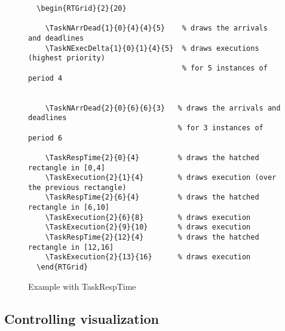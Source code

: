 \documentclass{article}
\begin{document}
\begin{figure}
  \centering
  \begin{RTGrid}{2}{20}
  

 

  \end{RTGrid}  
\begin{verbatim}
  \begin{RTGrid}{2}{20}
  
    \TaskNArrDead{1}{0}{4}{4}{5}    % draws the arrivals and deadlines
    \TaskNExecDelta{1}{0}{1}{4}{5}  % draws executions (highest priority) 
                                    % for 5 instances of period 4 

 
    \TaskNArrDead{2}{0}{6}{6}{3}   % draws the arrivals and deadlines
                                   % for 3 instances of period 6 

    \TaskRespTime{2}{0}{4}         % draws the hatched rectangle in [0,4]
    \TaskExecution{2}{1}{4}        % draws execution (over the previous rectangle)
    \TaskRespTime{2}{6}{4}         % draws the hatched rectangle in [6,10]
    \TaskExecution{2}{6}{8}        % draws execution
    \TaskExecution{2}{9}{10}       % draws execution
    \TaskRespTime{2}{12}{4}        % draws the hatched rectangle in [12,16]
    \TaskExecution{2}{13}{16}      % draws execution   
  \end{RTGrid}   
\end{verbatim}
  \caption{Example with TaskRespTime}
  \label{fig:resp-time}
\end{figure}


\subsection{Controlling visualization}
\end{document}
